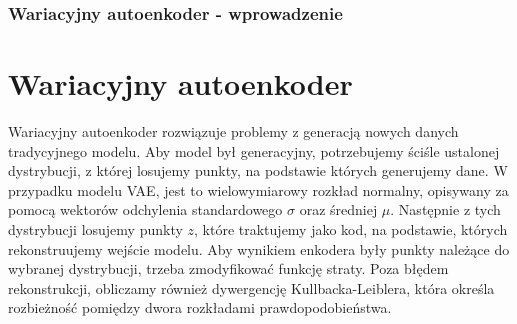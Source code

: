 \documentclass{beamer}
\begin{document}
	\begin{frame}
		\frametitle{Wariacyjny autoenkoder - wprowadzenie}
		\section{Wariacyjny autoenkoder}
		Wariacyjny autoenkoder rozwiązuje problemy z generacją nowych danych tradycyjnego modelu. Aby model był generacyjny, potrzebujemy ściśle ustalonej dystrybucji, z której losujemy punkty, na podstawie których generujemy dane. W przypadku modelu VAE, jest to wielowymiarowy rozkład normalny, opisywany za pomocą wektorów odchylenia standardowego $\sigma$ oraz średniej $\mu$. Następnie z tych dystrybucji losujemy punkty $z$, które traktujemy jako kod, na podstawie, których rekonstruujemy wejście modelu. Aby wynikiem enkodera były punkty należące do wybranej dystrybucji, trzeba zmodyfikować funkcję straty. Poza błędem rekonstrukcji, obliczamy również dywergencję Kullbacka-Leiblera, która określa rozbieżność pomiędzy dwora rozkładami prawdopodobieństwa. 
	\end{frame}

\end{document}
